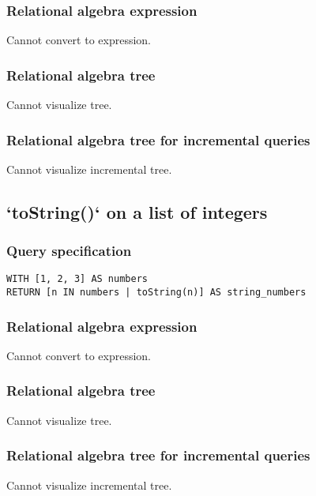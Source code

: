 \subsubsection*{Relational algebra expression}

Cannot convert to expression.

\subsubsection*{Relational algebra tree}

Cannot visualize tree.

\subsubsection*{Relational algebra tree for incremental queries}

Cannot visualize incremental tree.

\subsection{`toString()` on a list of integers}

\subsubsection*{Query specification}

\begin{lstlisting}
WITH [1, 2, 3] AS numbers
RETURN [n IN numbers | toString(n)] AS string_numbers
\end{lstlisting}

\subsubsection*{Relational algebra expression}

Cannot convert to expression.

\subsubsection*{Relational algebra tree}

Cannot visualize tree.

\subsubsection*{Relational algebra tree for incremental queries}

Cannot visualize incremental tree.

